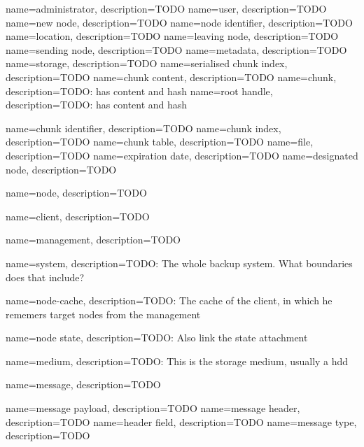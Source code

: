 {
	name={administrator},
	description={TODO}
}
{
	name={user},
	description={TODO}
}
{
	name={new node},
	description={TODO}
}
{
	name={node identifier},
	description={TODO}
}
{
	name={location},
	description={TODO}
}
{
	name={leaving node},
	description={TODO}
}
{
	name={sending node},
	description={TODO}
}
{
	name={metadata},
	description={TODO}
}
{
	name={storage},
	description={TODO}
}
{
	name={serialised chunk index},
	description={TODO}
}
{
	name={chunk content},
	description={TODO}
}
{
	name={chunk},
	description={TODO: has content and hash}
}
{
	name={root handle},
	description={TODO: has content and hash}
}

{
	name={chunk identifier},
	description={TODO}
}
{
	name={chunk index},
	description={TODO}
}
{
	name={chunk table},
	description={TODO}
}
{
	name={file},
	description={TODO}
}
{
	name={expiration date},
	description={TODO}
}
{
	name={designated node},
	description={TODO}
}

{
	name={node},
	description={TODO}
}

{
	name={client},
	description={TODO}
}

{
	name={management},
	description={TODO}
}

{
    name={system},
    description={TODO: The whole backup system. What boundaries does that include?}
}

{
    name={node-cache},
    description={TODO: The cache of the client, in which he rememers target nodes from the management}
}

{
    name={node state},
    description={TODO: Also link the state attachment}
}

{
    name={medium},
    description={TODO: This is the storage medium, usually a hdd}
}

{
    name={message},
    description={TODO}
}

{
    name={message payload},
    description={TODO}
}
{
    name={message header},
    description={TODO}
}
{
	name={header field},
    description={TODO}
}
{
	name={message type},
    description={TODO}
}

